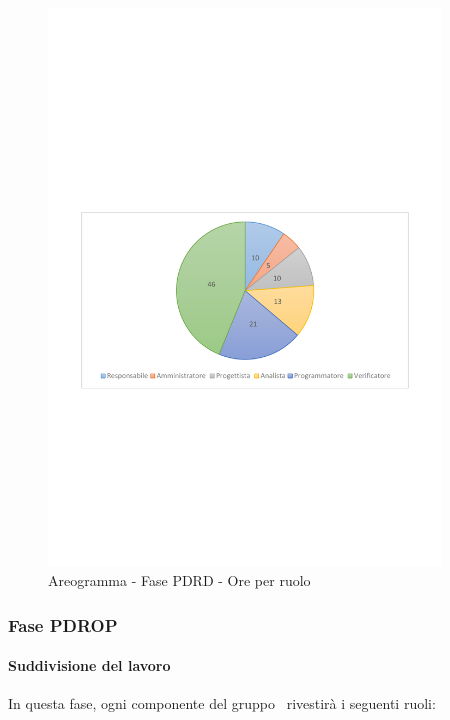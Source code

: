 \documentclass[../PianoProgetto.tex]{subfiles}
\begin{document}
		\begin{figure}[!h]
		\centering
		\includegraphics[width=0.93\textwidth , trim=2cm 9.5cm 2cm 11cm]{grafici/PDRD/PDRD-ore-ruolo}
			\caption{Areogramma - Fase PDRD - Ore per ruolo}
		\label{fig:CircleChart-fasePDRD_ore_r}
	\end{figure}
	
\vfill
	
	\subsubsection{Fase PDROP}
				\paragraph{Suddivisione del lavoro}
					In questa fase, ogni componente del gruppo \leaf\ rivestirà i seguenti ruoli:
	
\end{document}
